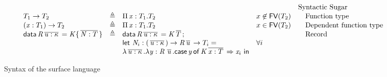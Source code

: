 \begin{figure*}
\centering
\gram{\ottpgm\ottinterrule
\ottdecl\ottinterrule
\ottu\ottinterrule
\ottp\ottinterrule
\ottE\ottinterrule
\ottV\ottinterrule
\ottGs}
    \[
    \begin{array}{lllll}
     &&&& \text{Syntactic Sugar} \\
     T_{{\mathrm{1}}}  \rightarrow  T_{{\mathrm{2}}} & \triangleq & \Pi \, \mathit{x}  :  T_{{\mathrm{1}}}  .  T_{{\mathrm{2}}} & x \not \in \mathsf{FV}(T_{{\mathrm{2}}}) & \quad\text{Function type} \\
     (  \mathit{x}  :  T_{{\mathrm{1}}}  )  \rightarrow  T_{{\mathrm{2}}} & \triangleq & \Pi \, \mathit{x}  :  T_{{\mathrm{1}}}  .  T_{{\mathrm{2}}} & x \in \mathsf{FV}(T_{{\mathrm{2}}}) & \quad\text{Dependent function type} \\
     \mathsf{data} \, \mathit{R}  \,\overline{  \mathit{u}  :  \kappa  }\,  =  \mathit{K}  \{  \,\overline{  \mathit{N}  :  T  }\,  \} & \triangleq &
                    \mathsf{data} \, \mathit{R}  \,\overline{  \mathit{u}  :  \kappa  }\,  =  \mathit{K}  \,\overline{  T  }\,; && \quad\text{Record} \\
                  &&  \mathsf{let} ~\mathit{N}_i : (  \,\overline{  \mathit{u}  :  \kappa  }\,  )  \rightarrow  \mathit{R}    \,\overline{  \mathit{u}  }\,  \rightarrow  T_i = & \forall i &  \\
                  && \lambda  \,\overline{  \mathit{u}  :  \kappa  }\,  .  \lambda  \mathit{y}  :  \mathit{R} \, \,\overline{  \mathit{u}  }\,  .  \mathsf{case} \, \mathit{y} \, \mathsf{of} \, \mathit{K}  \,\overline{  \mathit{x}  :  T  }\,  \Rightarrow  \mathit{x}_i~ \mathsf{in}  && \\
    \end{array}
    \]
\caption{Syntax of the surface language}
\label{fig:surface:syntax}
\end{figure*}


